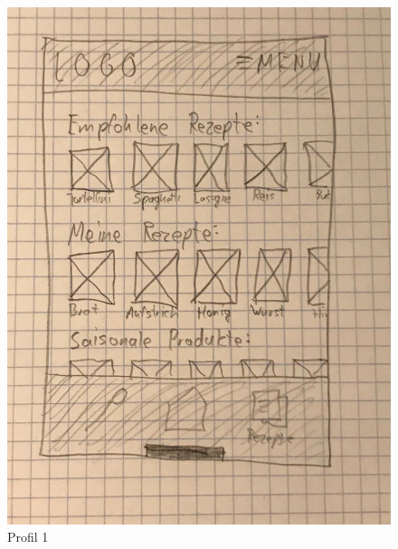\begin{figure}[H]
  \includegraphics[width=\linewidth]{./exercise13/Profil1.jpeg}
  \caption{Profil 1}
\end{figure}


